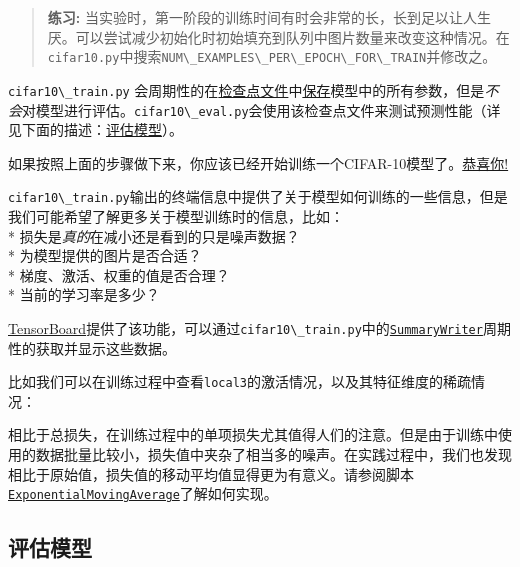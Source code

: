 \begin{quote}
\textbf{练习:}
当实验时，第一阶段的训练时间有时会非常的长，长到足以让人生厌。可以尝试减少初始化时初始填充到队列中图片数量来改变这种情况。在\lstinline{cifar10.py}中搜索\lstinline{NUM\_EXAMPLES\_PER\_EPOCH\_FOR\_TRAIN}并修改之。
\end{quote}

\lstinline{cifar10\_train.py}
会周期性的在\href{https://github.com/jikexueyuanwiki/tensorflow-zh/tree/master/SOURCE/how_tos/variables/index.md\#saving-and-restoring}{检查点文件}中\href{https://github.com/jikexueyuanwiki/tensorflow-zh/blob/master/SOURCE/api_docs/python/state_ops.md\#Saver}{保存}模型中的所有参数，但是\emph{不会}对模型进行评估。\lstinline{cifar10\_eval.py}会使用该检查点文件来测试预测性能（详见下面的描述：\protect\hyperlink{ux8bc4ux4f30ux6a21ux578b}{评估模型}）。

如果按照上面的步骤做下来，你应该已经开始训练一个CIFAR-10模型了。\href{https://www.youtube.com/watch?v=9bZkp7q19f0}{恭喜你!}

\lstinline{cifar10\_train.py}输出的终端信息中提供了关于模型如何训练的一些信息，但是我们可能希望了解更多关于模型训练时的信息，比如：\\
* 损失是\emph{真的}在减小还是看到的只是噪声数据？\\
* 为模型提供的图片是否合适？\\
* 梯度、激活、权重的值是否合理？\\
* 当前的学习率是多少？

\href{https://github.com/jikexueyuanwiki/tensorflow-zh/tree/master/SOURCE/how_tos/summaries_and_tensorboard/index.md}{TensorBoard}提供了该功能，可以通过\lstinline{cifar10\_train.py}中的\href{https://github.com/jikexueyuanwiki/tensorflow-zh/blob/master/SOURCE/api_docs/python/train.md\#SummaryWriter}{\lstinline{SummaryWriter}}周期性的获取并显示这些数据。

比如我们可以在训练过程中查看\lstinline{local3}的激活情况，以及其特征维度的稀疏情况：

相比于总损失，在训练过程中的单项损失尤其值得人们的注意。但是由于训练中使用的数据批量比较小，损失值中夹杂了相当多的噪声。在实践过程中，我们也发现相比于原始值，损失值的移动平均值显得更为有意义。请参阅脚本\href{https://github.com/jikexueyuanwiki/tensorflow-zh/blob/master/SOURCE/api_docs/python/train.md\#ExponentialMovingAverage}{\lstinline{ExponentialMovingAverage}}了解如何实现。

\hypertarget{ux8bc4ux4f30ux6a21ux578b}{\subsection{评估模型
}\label{ux8bc4ux4f30ux6a21ux578b}}


